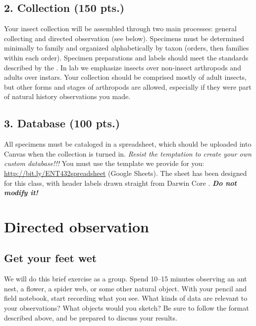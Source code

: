 \documentclass[letterpaper, 11pt]{article}
\begin{document}
\subsection*{2. Collection (150 pts.)}
Your insect collection will be assembled through two main processes: general collecting and directed observation (see below). Specimens must be determined minimally to family and organized alphabetically by taxon (orders, then families within each order). Specimen preparations and labels should meet the standards described by the \cite{FrostSOP03}. In lab we emphasize insects over non-insect arthropods and adults over instars. Your collection should be comprised mostly of adult insects, but other forms and stages of arthropods are allowed, especially if they were part of natural history observations you made.

\subsection*{3. Database (100 pts.)}
All specimens must be cataloged in a spreadsheet, which should be uploaded into Canvas when the collection is turned in. \textit{Resist the temptation to create your own custom database!!!} You must use the template we provide for you: \url{http://bit.ly/ENT432spreadsheet} (Google Sheets). The sheet has been designed for this class, with header labels drawn straight from Darwin Core \citep{DarwinCore}. \textbf{\textit{Do not modify it!}} 

\section*{Directed observation}

\subsection*{Get your feet wet}
We will do this brief exercise as a group. Spend 10--15 minutes observing an ant nest, a flower, a spider web, or some other natural object. With your pencil and field notebook, start recording what you see. What kinds of data are relevant to your observations? What objects would you sketch? Be sure to follow the format described above, and be prepared to discuss your results.
\end{document}
